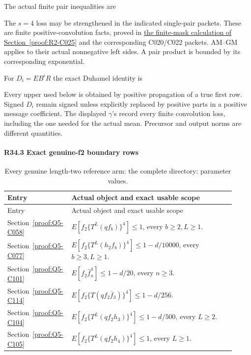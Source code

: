 The actual finite pair inequalities are


The \(s=4\) loss may be strengthened in the indicated single-pair packets.
These are finite positive-convolution facts, proved in \hyperref[part:R25.3]{the finite-mask calculation of Section~\ref{proof:R2-C025}} and the
corresponding C020/C022 packets. AM--GM applies to their actual nonnegative
left sides. A pair product is bounded by its corresponding exponential.

For \(D_i=EB^iR\) the exact Duhamel identity is


Every upper used below is obtained by positive propagation of a true first
row. Signed \(D_i\) remain signed unless explicitly replaced by positive
parts in a positive message coefficient. The displayed \(\gamma\)'s
record every finite convolution loss, including the one needed for the
actual mean. Precursor and output norms are different quantities.

\paragraph{R34.3 Exact genuine-f2 boundary rows}




\begingroup\small
\setlength{\tabcolsep}{3pt}
\setlength{\LTleft}{0pt}\setlength{\LTright}{\fill}
\begin{longtable}{@{}p{0.2200\linewidth}p{0.7000\linewidth}@{}}
\caption{Every genuine length-two reference arm: the complete directory: parameter values.}\label{tab:parameters:r2-c034:3}\\
\toprule
Entry & Actual object and exact usable scope \\
\midrule\endfirsthead
\toprule
Entry & Actual object and exact usable scope \\
\midrule\endhead
\bottomrule\endfoot
Section~\ref{proof:Q5-C058} & \(E[f_2\{T^L(qf_b)\}^4]\le1\), every \(b\ge2,\allowbreak  L\ge1\). \\
\addlinespace[2pt]
Section~\ref{proof:Q5-C077} & \(E[f_2\{T^L(h_2f_b)\}^4]\le1-d/10000\), every \(b\ge3,\allowbreak  L\ge1\). \\
\addlinespace[2pt]
Section~\ref{proof:Q5-C101} & \(E[f_2\bar f_n^4]\le1-d/20\), every \(n\ge3\). \\
\addlinespace[2pt]
Section~\ref{proof:Q5-C114} & \(E[f_2\{T(qf_2\bar f_3)\}^4]\le1-d/256\). \\
\addlinespace[2pt]
Section~\ref{proof:Q5-C104} & \(E[f_2\{T^L(qf_2h_3)\}^4]\le1-d/500\), every \(L\ge2\). \\
\addlinespace[2pt]
Section~\ref{proof:Q5-C105} & \(E[f_2\{T^L(qf_2h_4)\}^4]\le1\), every \(L\ge1\). \\
\end{longtable}
\endgroup


